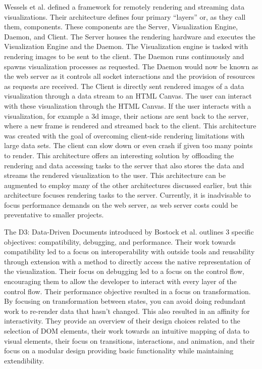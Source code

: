 Wessels et al. \cite{remotevis} defined a framework for remotely rendering and streaming data visualizations.  Their architecture defines four primary “layers” or, as they call them, components.  These components are the Server, Visualization Engine, Daemon, and Client.  The Server houses the rendering hardware and executes the Visualization Engine and the Daemon.  The Visualization engine is tasked with rendering images to be sent to the client.  The Daemon runs continuously and spawns visualization processes as requested.  The Daemon would now be known as the web server as it controls all socket interactions and the provision of resources as requests are received.  The Client is directly sent rendered images of a data visualization through a data stream to an HTML Canvas.  The user can interact with these visualization through the HTML Canvas.  If the user interacts with a visualization, for example a 3d image, their actions are sent back to the server, where a new frame is rendered and streamed back to the client.  This architecture was created with the goal of overcoming client-side rendering limitations with large data sets.  The client can slow down or even crash if given too many points to render.  This architecture offers an interesting solution by offloading the rendering and data accessing tasks to the server that also stores the data and streams the rendered visualization to the user.  This architecture can be augmented to employ many of the other architectures discussed earlier, but this architecture focuses rendering tasks to the server. Currently, it is inadvisable to focus performance demands on the web server, as web server costs could be preventative to smaller projects. \par
The D3: Data-Driven Documents introduced by Bostock et al. \cite{d3} outlines 3 specific objectives: compatibility, debugging, and performance.  Their work towards compatibility led to a focus on interoperability with outside tools and reusability through extension with a method to directly access the native representation of the visualization.  Their focus on debugging led to a focus on the control flow, encouraging them to allow the developer to interact with every layer of the control flow.  Their performance objective resulted in a focus on transformation.  By focusing on transformation between states, you can avoid doing redundant work to re-render data that hasn’t changed.  This also resulted in an affinity for interactivity.  They provide an overview of their design choices related to the selection of DOM elements, their work towards an intuitive mapping of data to visual elements, their focus on transitions, interactions, and animation, and their focus on a modular design providing basic functionality while maintaining extendibility. \par
